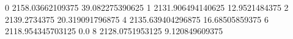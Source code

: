 0 2158.03662109375 39.082275390625
1 2131.906494140625 12.9521484375
2 2139.2734375 20.319091796875
4 2135.639404296875 16.68505859375
6 2118.954345703125 0.0
8 2128.0751953125 9.120849609375
